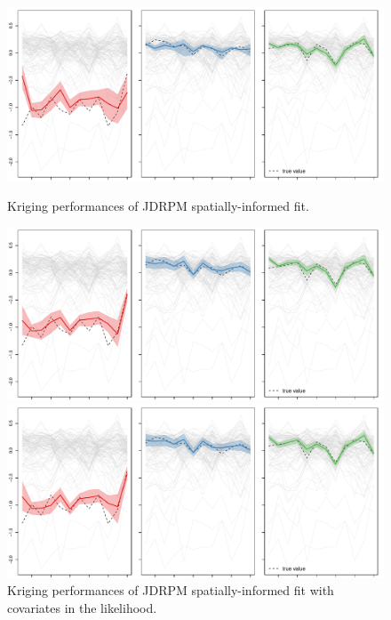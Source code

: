 \documentclass[12pt,	%
	a4paper,		%
	twoside,		%
	openright,		%
	titlepage,%
	]{book}
\theoremstyle{definition}
\begin{document}
\begin{figure}[!p]
\centering
    \includegraphics[width=1\linewidth]{Testing/new kriking/JDRPM - NA fit - space_VERTICAL_BLACK.pdf}
    \caption[Kriging performances of JDRPM, spatial information]{Kriging performances of JDRPM spatially-informed fit.}
    \label{fig:krig JDRPM space}  
    \includegraphics[width=1\linewidth]{Testing/new kriking/JDRPM - NA fit - space + Xlk_VERTICAL_BLACK.pdf}
    \caption[Kriging performances of JDRPM, spatial information, covariates in the likelihood]{Kriging performances of JDRPM spatially-informed fit with covariates in the likelihood.}
    \label{fig:krig JDRPM space Xlk}
    \includegraphics[width=1\linewidth]{Testing/new kriking/JDRPM - NA fit - space + Xlk + Xcl_VERTICAL_BLACK.pdf}

\end{figure}
\end{document}
